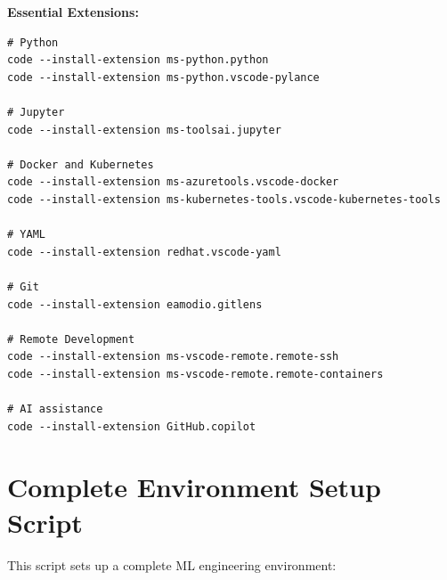 \textbf{Essential Extensions:}
\begin{lstlisting}[style=shell]
# Python
code --install-extension ms-python.python
code --install-extension ms-python.vscode-pylance

# Jupyter
code --install-extension ms-toolsai.jupyter

# Docker and Kubernetes
code --install-extension ms-azuretools.vscode-docker
code --install-extension ms-kubernetes-tools.vscode-kubernetes-tools

# YAML
code --install-extension redhat.vscode-yaml

# Git
code --install-extension eamodio.gitlens

# Remote Development
code --install-extension ms-vscode-remote.remote-ssh
code --install-extension ms-vscode-remote.remote-containers

# AI assistance
code --install-extension GitHub.copilot
\end{lstlisting}

\section{Complete Environment Setup Script}

This script sets up a complete ML engineering environment:

